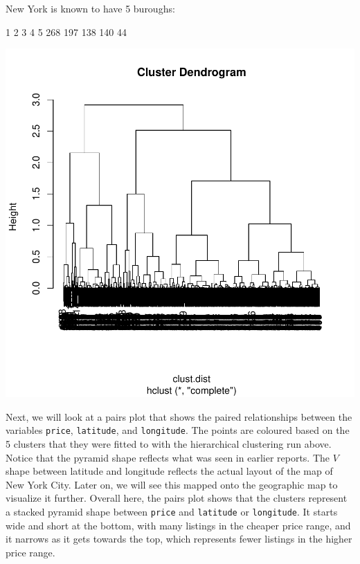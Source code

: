 \documentclass[11pt, a4paper]{article}
\begin{document}
\begin{Schunk}
\begin{Soutput}
New York is known to have 5 buroughs:
\end{Soutput}
\begin{Soutput}
  1   2   3   4   5 
268 197 138 140  44 
\end{Soutput}
\end{Schunk}
\includegraphics{project_report-011}

Next, we will look at a pairs plot that shows the paired relationships between the variables \texttt{price}, \texttt{latitude}, and  \texttt{longitude}. The points are coloured based on the 5 clusters that they were fitted to with the hierarchical clustering run above. Notice that the pyramid shape reflects what was seen in earlier reports. The $V$ shape between latitude and longitude reflects the actual layout of the map of New York City. Later on, we will see this mapped onto the geographic map to visualize it further. Overall here, the pairs plot shows that the clusters represent a stacked pyramid shape between \texttt{price} and \texttt{latitude} or \texttt{longitude}. It starts wide and short at the bottom, with many listings in the cheaper price range, and it narrows as it gets towards the top, which represents fewer listings in the higher price range.
\end{document}
